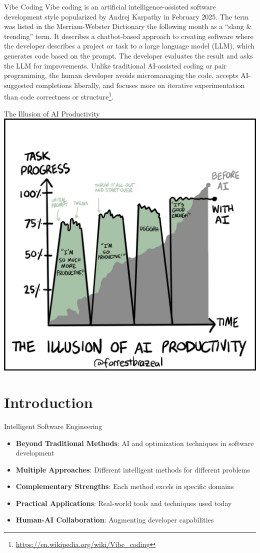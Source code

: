 \documentclass{beamer}
\begin{document}
\begin{frame}[t]{Vibe Coding}
    Vibe coding is an artificial intelligence-assisted software development style popularized by Andrej Karpathy in February 2025. The term was listed in the Merriam-Webster Dictionary the following month as a ``slang \& trending'' term. It describes a chatbot-based approach to creating software where the developer describes a project or task to a large language model (LLM), which generates code based on the prompt. The developer evaluates the result and asks the LLM for improvements. Unlike traditional AI-assisted coding or pair programming, the human developer avoids micromanaging the code, accepts AI-suggested completions liberally, and focuses more on iterative experimentation than code correctness or structure\footnote{\url{https://en.wikipedia.org/wiki/Vibe_coding}}.
\end{frame}

\begin{frame}[t]{The Illusion of AI Productivity}
    \centering
\includegraphics[width=.5\textwidth]{before_ai.jpeg} 
\end{frame}

\section{Introduction}
\begin{frame}[t]{Intelligent Software Engineering}
\begin{itemize}
\item \textbf{Beyond Traditional Methods}: AI and optimization techniques in software development
\item \textbf{Multiple Approaches}: Different intelligent methods for different problems
\item \textbf{Complementary Strengths}: Each method excels in specific domains
\item \textbf{Practical Applications}: Real-world tools and techniques used today
\item \textbf{Human-AI Collaboration}: Augmenting developer capabilities
\end{itemize}
\end{frame}
\end{document}
